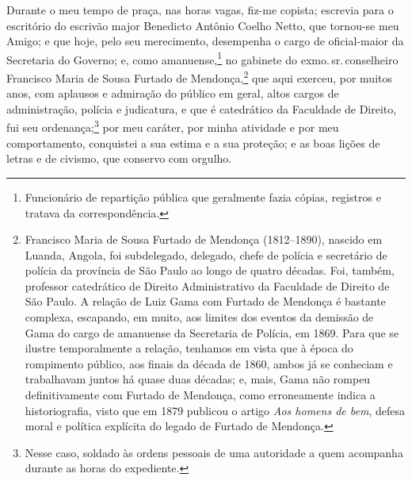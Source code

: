 Durante o meu tempo de praça, nas horas vagas, fiz-me copista; escrevia
para o escritório do escrivão major Benedicto Antônio Coelho Netto, que
tornou-se meu Amigo; e que hoje, pelo seu merecimento, desempenha o
cargo de oficial-maior da Secretaria do Governo; e, como
amanuense,\footnote{Funcionário de repartição pública que geralmente
  fazia cópias, registros e tratava da correspondência.} no gabinete do
exmo.\,sr.\,conselheiro Francisco Maria de Sousa Furtado de
Mendonça,\footnote{Francisco Maria de Sousa Furtado de Mendonça \label{fmfm}
  (1812--1890), nascido em Luanda, Angola, foi subdelegado, delegado,
  chefe de polícia e secretário de polícia da província de São Paulo ao
  longo de quatro décadas. Foi, também, professor catedrático de Direito
  Administrativo da Faculdade de Direito de São Paulo. A relação de Luiz
  Gama com Furtado de Mendonça é bastante complexa, escapando, em muito,
  aos limites dos eventos da demissão de Gama do cargo de amanuense da
  Secretaria de Polícia, em 1869. Para que se ilustre temporalmente a
  relação, tenhamos em vista que à época do rompimento público, aos
  finais da década de 1860, ambos já se conheciam e trabalhavam juntos
  há quase duas décadas; e, mais, Gama não rompeu definitivamente com
  Furtado de Mendonça, como erroneamente indica a historiografia, visto
  que em 1879 publicou o artigo \emph{Aos homens de bem}, defesa moral e
  política explícita do legado de Furtado de Mendonça.} que aqui
exerceu, por muitos anos, com aplausos e admiração do público em geral,
altos cargos de administração, polícia e judicatura, e que é catedrático
da Faculdade de Direito, fui seu ordenança;\footnote{Nesse caso,
  soldado às ordens pessoais de uma autoridade a quem acompanha durante
  as horas do expediente.} por meu caráter, por minha atividade e por
meu comportamento, conquistei a sua estima e a sua proteção; e as boas
lições de letras e de civismo, que conservo com orgulho.

